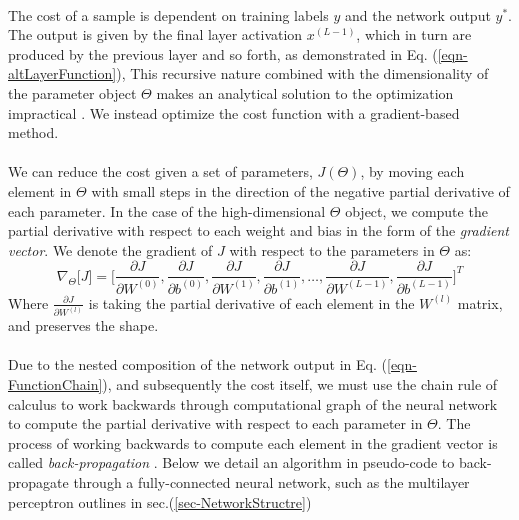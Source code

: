 \documentclass[12pt,letterpaper]{article}
\begin{document}
\paragraph*{}The cost of a sample is dependent on training labels $y$ and the network output $y^*$. The output is given by the final layer activation $x^{(L-1)}$, which in turn are produced by the previous layer and so forth, as demonstrated in Eq. (\ref{eqn-altLayerFunction}), This recursive nature combined with the dimensionality of the parameter object $\Theta$ makes an analytical solution to the optimization impractical \cite{Geron,Goodfellow,James}. We instead optimize the cost function with a gradient-based method. 

\paragraph*{}We can reduce the cost given a set of parameters, $J(\Theta)$, by moving each element in $\Theta$ with small steps in the direction of the negative partial derivative of each parameter. In the case of the high-dimensional $\Theta$ object, we compute the partial derivative with respect to each weight and bias in the form of the \textit{gradient vector}. We denote the gradient of $J$ with respect to the parameters in $\Theta$ as:
\begin{equation}
\label{eqn-CostGradient}
\nabla_{\Theta}\big[ J \big] = 
\Big[ 	\frac{\partial J}{\partial W^{(0)}}, \frac{\partial J}{\partial b^{(0)}}, 
		\frac{\partial J}{\partial W^{(1)}}, \frac{\partial J}{\partial b^{(1)}}, \hdots ,
		\frac{\partial J}{\partial W^{(L-1)}}, \frac{\partial J}{\partial b^{(L-1)}} \Big]^T
\end{equation}
Where $\frac{\partial J}{\partial W^{(l)}}$ is taking the partial derivative of each element in the $W^{(l)}$ matrix, and preserves the shape.

\paragraph*{}Due to the nested composition of the network output in Eq. (\ref{eqn-FunctionChain}), and subsequently the cost itself, we must use the chain rule of calculus to work backwards through computational graph of the neural network to compute the partial derivative with respect to each parameter in $\Theta$. The process of working backwards to compute each element in the gradient vector is called \textit{back-propagation} \cite{Geron}. Below we detail an algorithm in pseudo-code to back-propagate through a fully-connected neural network, such as the multilayer perceptron outlines in sec.(\ref{sec-NetworkStructre})
\end{document}
